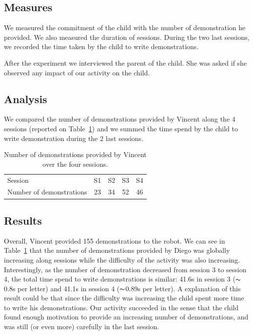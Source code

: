 \documentclass[conference]{IEEEtran}
\begin{document}
\subsection{Measures}

We measured the commitment of the child with the number of demonstration he provided. We also measured the duration of sessions. During the two last sessions, we recorded the time taken by the child to write demonstrations.

After the experiment we interviewed the parent of the child. She was asked if she observed any impact of our activity on the child.


\subsection{Analysis}

We compared the number of demonstrations provided by Vincent along the 4 sessions (reported on Table~\ref{table:vincent_sess}) and we summed the time spend by the child to write demonstration during the 2 last sessions.
\begin{table}
    \centering
    \caption{\footnotesize Number of demonstrations provided by Vincent over the four sessions.}
    \begin{tabular}{lcccc}
        \toprule
        Session & S1 & S2 & S3 & S4\\ 
        Number of demonstrations & 23 & 34 & 52 & 46\\ 
        \bottomrule

    \end{tabular}
    \label{table:vincent_sess}
\end{table}
\subsection{Results}
Overall, Vincent provided 155 demonstrations to the robot. We can see in Table~\ref{table:vincent_sess} that the number of demonstrations provided by Diego was globally increasing along sessions while the difficulty of the activity was also increasing. Interestingly, as the number of demonstration decreased from session 3 to session 4, the total time spend to write demonstrations is similar: 41.6s in session 3 ($\thicksim$0.8s per letter) and 41.1s in session 4 ($\thicksim$0.89s per letter). A explanation of this result could be that since the difficulty was increasing the child spent more time to write his demonstrations. Our activity succeeded in the sense that the child found enough motivation to provide an increasing number of demonstrations, and was still (or even more) carefully in the last session.
\end{document}
